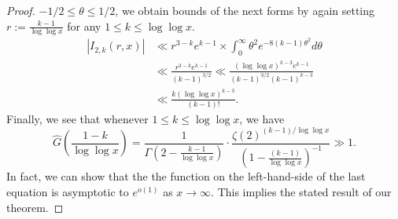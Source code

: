\documentclass[11pt,reqno,a4letter]{article}
\numberwithin{figure}{section}
\numberwithin{table}{section}
\theoremstyle{plain}
\numberwithin{theorem}{section}
\theoremstyle{definition}
\begin{document}
\begin{proof}
$-1/2 \leq \theta \leq 1/2$, we obtain bounds of the next forms by again 
setting $r := \frac{k-1}{\log\log x}$ for any $1 \leq k \leq \log\log x$. 
\begin{align*}
|I_{2,k}(r, x)| & \ll r^{3-k} e^{k-1} \times \int_0^{\infty} \theta^2 e^{-8(k-1) \theta^2} d\theta \\ 
     & \ll \frac{r^{3-k} e^{k-1}}{(k-1)^{3/2}} \ll 
     \frac{(\log\log x)^{k-3} e^{k-1}}{(k-1)^{3/2} (k-1)^{k-3}} \\ 
     & \ll 
     \frac{k (\log\log x)^{k-3}}{(k-1)!}. 
\end{align*}
Finally, we see that whenever $1 \leq k \leq \log\log x$, we have 
\[
\widehat{G}\left(\frac{1-k}{\log\log x}\right) = \frac{1}{\Gamma\left(2-\frac{k-1}{\log\log x}\right)} \cdot 
     \frac{\zeta(2)^{(k-1)/\log\log x}}{\left(1-\frac{(k-1)}{\log\log x}\right)^{-1}} \gg 1. 
\]
In fact, we can show that the the function on the left-hand-side of the last equation is 
asymptotic to $e^{o(1)}$ as $x \rightarrow \infty$. 
This implies the stated result of our theorem. 
\end{proof} 
\end{document}
